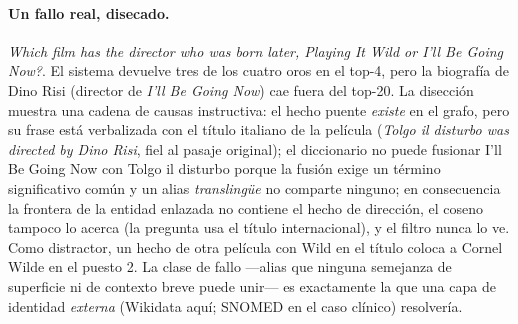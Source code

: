 \documentclass[11pt,a4paper]{article}
\begin{document}
\paragraph{Un fallo real, disecado.}
\guillemotleft{}\emph{Which film has the director who was born later, Playing It Wild or
I'll Be Going Now?}\guillemotright{}. El sistema devuelve tres de los cuatro oros en el
top-4, pero la biografía de Dino Risi (director de \emph{I'll Be Going
Now}) cae fuera del top-20. La disección muestra una cadena de causas
instructiva: el hecho puente \emph{existe} en el grafo, pero su frase está
verbalizada con el título italiano de la película
(\guillemotleft{}\emph{Tolgo il disturbo was directed by Dino Risi}\guillemotright{}, fiel al pasaje
original); el diccionario no puede fusionar \guillemotleft{}I'll Be Going Now\guillemotright{} con
\guillemotleft{}Tolgo il disturbo\guillemotright{} porque la fusión exige un término significativo
común y un alias \emph{translingüe} no comparte ninguno; en consecuencia la
frontera de la entidad enlazada no contiene el hecho de dirección, el
coseno tampoco lo acerca (la pregunta usa el título internacional), y el
filtro nunca lo ve. Como distractor, un hecho de otra película con
\guillemotleft{}Wild\guillemotright{} en el título coloca a Cornel Wilde en el puesto 2. La clase de
fallo ---alias que ninguna semejanza de superficie ni de contexto breve
puede unir--- es exactamente la que una capa de identidad \emph{externa}
(Wikidata aquí; SNOMED en el caso clínico) resolvería.
\end{document}
